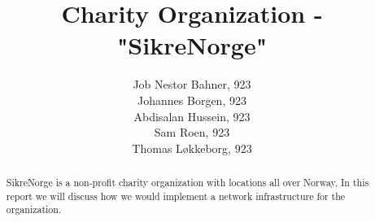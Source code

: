 
\newcommand{\notetous}[1] {
  \textbf{\textit{\textcolor{red}{#1}}}
}



\title{Charity Organization - "SikreNorge"}

\author{
  Job Nestor Bahner, 923\\
  Johannes Borgen, 923\\
  Abdisalan Hussein, 923\\
  Sam Roen, 923\\
  Thomas Løkkeborg, 923
}



\maketitle

\begin{abstract}
SikreNorge is a non-profit charity organization with locations all over Norway. In this report we will discuss how we would implement a network infrastructure for the organization.
\end{abstract}

\thispagestyle{empty}

\clearpage
{}
\setcounter{page}{1}
\tableofcontents

